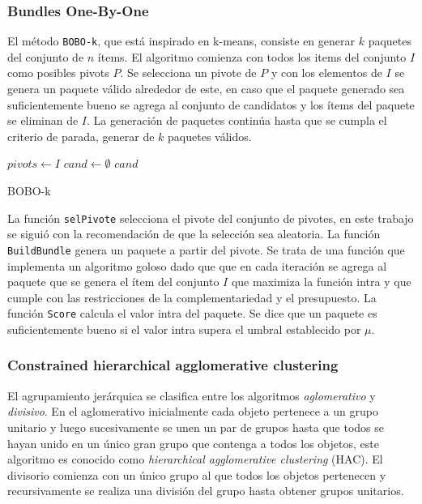 \subsubsection{Bundles One-By-One}
El método \texttt{BOBO-k}, que está inspirado en k-means, consiste en generar $k$ paquetes del conjunto de $n$ ítems. El algoritmo comienza con todos los items del conjunto $I$ como posibles pivots $P$. Se selecciona un pivote de $P$ y con los elementos de $I$ se genera un paquete válido alrededor de este, en caso que el paquete generado sea suficientemente bueno se agrega al conjunto de candidatos y los ítems del paquete se eliminan de $I$. La generación de paquetes continúa hasta que se cumpla el criterio de parada, generar de $k$ paquetes válidos.

\begin{algorithm}[H]
\DontPrintSemicolon
\SetAlgoLined
	$pivots \leftarrow I$\;
	$cand \leftarrow \emptyset$\;
	\Return $cand$\;
\caption{BOBO-k}\label{alg:bobo}
\end{algorithm}

La función \texttt{selPivote} selecciona el pivote del conjunto de pivotes, en este trabajo se siguió con la recomendación de \cite{Zhang:2002:ESI:638644.638646} que la selección sea aleatoria. La función \texttt{BuildBundle} genera un paquete a partir del pivote. Se trata de una función que implementa un algoritmo goloso dado que que en cada iteración se agrega al paquete que se genera el ítem del conjunto $I$ que maximiza la función intra y que cumple con las restricciones de la complementariedad y el presupuesto. La función \texttt{Score} calcula el valor intra del paquete. Se dice que un paquete es suficientemente bueno si el valor intra supera el umbral establecido por $\mu$.


\subsubsection{Constrained hierarchical agglomerative clustering}
El agrupamiento jerárquica se clasifica entre los algoritmos \textit{aglomerativo} y \textit{divisivo}. En el aglomerativo inicialmente cada objeto pertenece a un grupo unitario y luego sucesivamente se unen un par de grupos hasta que todos se hayan unido en un único gran grupo que contenga a todos los objetos, este algoritmo es conocido como \textit{hierarchical agglomerative clustering} (HAC). El divisorio comienza con un único grupo al que todos los objetos pertenecen y recursivamente se realiza una división del grupo hasta obtener grupos unitarios.

